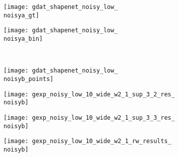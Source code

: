 \begin{figure*}[t]
{\begin{subfigure}[t]{1\textwidth}
\begin{subfigure}[t]{0.095\textwidth}
        	\texttt{[image: gdat\_shapenet\_noisy\_low\_\\noisya\_gt]}
        \end{subfigure}
        \begin{subfigure}[t]{0.095\textwidth}
            \vspace{0px}\centering
            \texttt{[image: gdat\_shapenet\_noisy\_low\_\\noisya\_bin]}
        \end{subfigure}
        \\[-2px]
        \begin{subfigure}[t]{0.095\textwidth}
        	\vspace{0px}\centering
        	\texttt{[image: gdat\_shapenet\_noisy\_low\_\\noisyb\_points]}
        \end{subfigure}
        \begin{subfigure}[t]{0.095\textwidth}
        	\vspace{0px}\centering
        	\texttt{[image: gexp\_noisy\_low\_10\_wide\_w2\_1\_sup\_3\_2\_res\_\\noisyb]}
        \end{subfigure}
        \begin{subfigure}[t]{0.095\textwidth}
        	\vspace{0px}\centering
        	\texttt{[image: gexp\_noisy\_low\_10\_wide\_w2\_1\_sup\_3\_3\_res\_\\noisyb]}
        \end{subfigure}
        \begin{subfigure}[t]{0.095\textwidth}
        	\vspace{0px}\centering
        	\texttt{[image: gexp\_noisy\_low\_10\_wide\_w2\_1\_rw\_results\_\\noisyb]}
        \end{subfigure}
        \begin{subfigure}[t]{0.095\textwidth}
            \vspace{0px}\centering

\end{subfigure}
\end{subfigure}}
\end{figure*}

